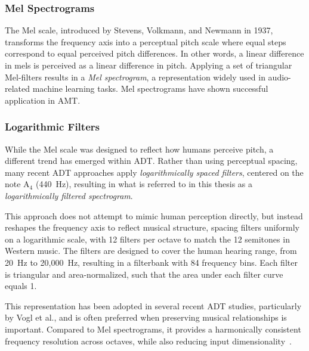 \subsubsection{Mel Spectrograms}

The Mel scale, introduced by Stevens, Volkmann, and Newmann in 1937, transforms the frequency axis into a perceptual pitch scale where equal steps correspond to equal perceived pitch differences. In other words, a linear difference in mels is perceived as a linear difference in pitch. Applying a set of triangular Mel-filters results in a \textit{Mel spectrogram}, a representation widely used in audio-related machine learning tasks. Mel spectrograms have shown successful application in \gls{AMT}.~\cite{gardner2022mt3multitaskmultitrackmusic, chang2024yourmt3+, gong2021astaudiospectrogramtransformer, wolfmonheim2024spectralrhythmfeaturesaudio, 8350302}

\subsubsection{Logarithmic Filters}

While the Mel scale was designed to reflect how humans perceive pitch, a different trend has emerged within \acrfull{ADT}. Rather than using perceptual spacing, many recent \gls{ADT} approaches apply \textit{logarithmically spaced filters}, centered on the note $\text{A}_4$ (440~Hz), resulting in what is referred to in this thesis as a \textit{logarithmically filtered spectrogram}. 

This approach does not attempt to mimic human perception directly, but instead reshapes the frequency axis to reflect musical structure, spacing filters uniformly on a logarithmic scale, with 12 filters per octave to match the 12 semitones in Western music. The filters are designed to cover the human hearing range, from 20~Hz to 20,000~Hz, resulting in a filterbank with 84 frequency bins. Each filter is triangular and area-normalized, such that the area under each filter curve equals 1.

This representation has been adopted in several recent \gls{ADT} studies, particularly by Vogl et al., and is often preferred when preserving musical relationships is important. Compared to Mel spectrograms, it provides a harmonically consistent frequency resolution across octaves, while also reducing input dimensionality~\cite{Vogl2017DrumTV, vogl2018multiinstrumentdrumtranscription, jia2019deep, signals4040042, zehren2024analyzingreducingsynthetictorealtransfer}.

